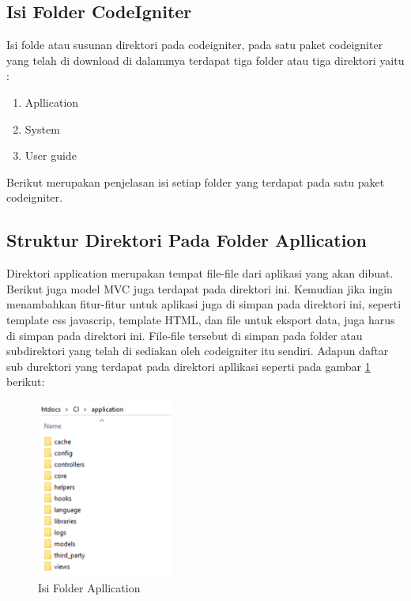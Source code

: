 \subsection{Isi Folder CodeIgniter}

Isi folde atau susunan direktori pada codeigniter, pada satu paket codeigniter yang telah di download di dalammya terdapat tiga folder atau tiga direktori yaitu :
\begin{enumerate}
\item Apllication 
\item System 
\item User guide 
\end{enumerate}
Berikut merupakan penjelasan isi setiap folder yang terdapat pada satu paket codeigniter.


\subsection{Struktur Direktori Pada Folder Apllication}
Direktori application merupakan tempat file-file dari aplikasi yang akan dibuat. Berikut juga model MVC juga terdapat pada direktori ini. Kemudian jika ingin menambahkan fitur-fitur untuk aplikasi juga di simpan pada direktori ini, seperti template css javascrip, template HTML, dan file untuk eksport data, juga harus di simpan pada direktori ini. File-file tersebut di simpan pada folder atau subdirektori yang telah di sediakan oleh codeigniter itu sendiri.
Adapun daftar sub durektori yang terdapat pada direktori apllikasi seperti pada gambar \ref{C7} berikut:
\begin{figure}[!htbp]
	\centerline{\includegraphics[width=0.40\textwidth]{figures/ci/7.png}}
	\caption{Isi Folder Apllication}
	\label{C7}
\end{figure}

